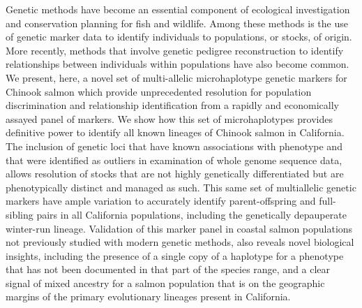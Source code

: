 

Genetic methods have become an essential component of ecological investigation
and conservation planning for fish and wildlife. Among these methods is the use
of genetic marker data to identify individuals to
populations, or stocks, of origin. More recently, methods that involve genetic
pedigree reconstruction to identify relationships between individuals within populations
have also become common. We present, here, a novel set of
multi-allelic microhaplotype genetic markers for Chinook salmon which provide unprecedented
resolution for population discrimination and relationship identification from a rapidly and
economically assayed panel of markers. We show how this set of microhaplotypes
provides definitive power to identify all known lineages of Chinook salmon in
California. The inclusion of genetic loci that have known associations with phenotype
and that were identified as outliers in examination of whole genome sequence data,
allows resolution of stocks that are not highly genetically differentiated but
are phenotypically distinct and managed as such. 
This same set of multiallelic genetic markers have ample variation to
accurately identify parent-offspring and full-sibling
pairs in all California populations, including the genetically depauperate winter-run
lineage.
Validation of this marker panel in coastal salmon populations not previously studied with
modern genetic methods, also reveals novel biological insights, including
the presence of a single copy of a haplotype for a phenotype that has not
been documented in that part of the species range, and a clear signal of mixed
ancestry for a salmon population that is on the geographic margins of the 
primary evolutionary lineages present in California.
